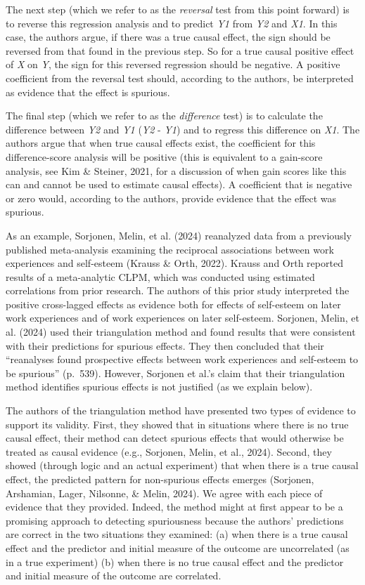\documentclass[
  man,mask,floatsintext]{apa6}
\begin{document}
The next step (which we refer to as the \emph{reversal} test from this point forward) is to reverse this regression analysis and to predict \emph{Y1} from \emph{Y2} and \emph{X1}. In this case, the authors argue, if there was a true causal effect, the sign should be reversed from that found in the previous step. So for a true causal positive effect of \emph{X} on \emph{Y}, the sign for this reversed regression should be negative. A positive coefficient from the reversal test should, according to the authors, be interpreted as evidence that the effect is spurious.

The final step (which we refer to as the \emph{difference} test) is to calculate the difference between \emph{Y2} and \emph{Y1} (\emph{Y2} - \emph{Y1}) and to regress this difference on \emph{X1}. The authors argue that when true causal effects exist, the coefficient for this difference-score analysis will be positive (this is equivalent to a gain-score analysis, see Kim \& Steiner, 2021, for a discussion of when gain scores like this can and cannot be used to estimate causal effects). A coefficient that is negative or zero would, according to the authors, provide evidence that the effect was spurious.

As an example, Sorjonen, Melin, et al. (2024) reanalyzed data from a previously published meta-analysis examining the reciprocal associations between work experiences and self-esteem (Krauss \& Orth, 2022). Krauss and Orth reported results of a meta-analytic CLPM, which was conducted using estimated correlations from prior research. The authors of this prior study interpreted the positive cross-lagged effects as evidence both for effects of self-esteem on later work experiences and of work experiences on later self-esteem. Sorjonen, Melin, et al. (2024) used their triangulation method and found results that were consistent with their predictions for spurious effects. They then concluded that their ``reanalyses found prospective effects between work experiences and self-esteem to be spurious'' (p.~539). However, Sorjonen et al.'s claim that their triangulation method identifies spurious effects is not justified (as we explain below).

The authors of the triangulation method have presented two types of evidence to support its validity. First, they showed that in situations where there is no true causal effect, their method can detect spurious effects that would otherwise be treated as causal evidence (e.g., Sorjonen, Melin, et al., 2024). Second, they showed (through logic and an actual experiment) that when there is a true causal effect, the predicted pattern for non-spurious effects emerges (Sorjonen, Arshamian, Lager, Nilsonne, \& Melin, 2024). We agree with each piece of evidence that they provided. Indeed, the method might at first appear to be a promising approach to detecting spuriousness because the authors' predictions are correct in the two situations they examined: (a) when there is a true causal effect and the predictor and initial measure of the outcome are uncorrelated (as in a true experiment) (b) when there is no true causal effect and the predictor and initial measure of the outcome are correlated.
\end{document}
